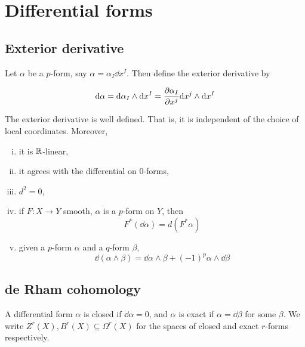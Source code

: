 \section{Differential forms}

\subsection{Exterior derivative}

\begin{definition}

    Let \(\alpha\) be a \(p\)-form, say \(\alpha = \alpha_I \dd x^I\). Then define the exterior derivative by

    \[\dd \alpha = \dd \alpha_I \wedge \dd x^I = \pdv{\alpha_I}{x^j}\dd x^j \wedge \dd x^I\]
\end{definition}

\begin{proposition}
    The exterior derivative is well defined. That is, it is independent of the choice of local coordinates. Moreover,

    \begin{enumerate}[(i)]
        \item it is \(\mathbb{R}\)-linear,
        \item it agrees with the differential on \(0\)-forms,
        \item \(d^2 = 0\),
        \item if \(F : X \to Y\) smooth, \(\alpha\) is a \(p\)-form on \(Y\), then
        \[F^*(\dd\alpha) = d(F^*\alpha)\]
        \item given a \(p\)-form \(\alpha\) and a \(q\)-form \(\beta\),
        \[\dd(\alpha\wedge\beta) = \dd \alpha \wedge \beta + (-1)^p \alpha \wedge \dd\beta\]
    \end{enumerate}
\end{proposition}

\subsection{de Rham cohomology}

\begin{definition}
     A differential form \(\alpha\) is closed if \(\dd\alpha = 0\), and \(\alpha\) is exact if \(\alpha = \dd\beta\) for some \(\beta\). We write \(Z^r(X), B^r(X) \subseteq \Omega^r(X)\) for the spaces of closed and exact \(r\)-forms respectively. 
\end{definition}

